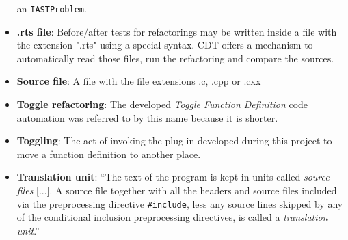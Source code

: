 \begin{itemize}
an \texttt{IASTProblem}.
\item \textbf{.rts file}: Before/after tests for refactorings may be written 
inside a file with the extension ".rts" using a special syntax. CDT offers a 
mechanism to automatically read those files, run the refactoring and compare the 
sources.
\item \textbf{Source file}: A file with the file extensions .c, .cpp or .cxx
\item \textbf{Toggle refactoring}: The developed \textit{Toggle Function 
Definition} code automation was referred to by this name because it is shorter.
\item \textbf{Toggling}: The act of invoking the plug-in developed during this 
project to move a function definition to another place.
\item \textbf{Translation unit}: ``The text of the program is kept in units 
called \textit{source files} [...]. A source file together with all the headers and 
source files included via the preprocessing directive \texttt{\#include}, less 
any source lines skipped by any of the conditional inclusion preprocessing 
directives, is called a \textit{translation unit}.''\cite{IsoCpp}
\end{itemize}

